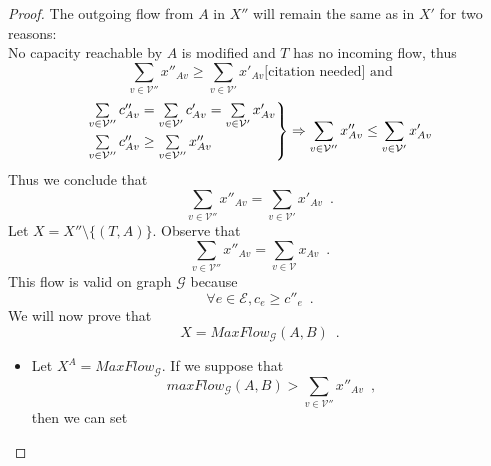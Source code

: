 \documentclass[11pt]{llncs}
\begin{document}
\begin{proof}
       The outgoing flow from $A$ in $X''$ will remain the same as in $X'$ for two reasons: \\
       No capacity reachable by $A$ is modified and $T$ has no incoming flow, thus
       \begin{equation}
          \sum\limits_{v \in \mathcal{V}''}x''_{Av} \geq \sum\limits_{v \in \mathcal{V}'}x'_{Av} \mbox{[citation needed] and}
       \end{equation}
       \begin{equation}
          \begin{rcases}
             \sum\limits_{v \in \mathcal{V}''}c''_{Av} = \sum\limits_{v \in \mathcal{V}'}c'_{Av} = \sum\limits_{v \in
             \mathcal{V}'}x'_{Av} \\
             \sum\limits_{v \in \mathcal{V}''}c''_{Av} \geq \sum\limits_{v \in \mathcal{V}''}x''_{Av}
          \end{rcases}
          \Rightarrow \sum\limits_{v \in \mathcal{V}''}x''_{Av} \leq \sum\limits_{v \in \mathcal{V}'}x'_{Av}
       \end{equation}
       Thus we conclude that
       \begin{equation}
       \label{primeequaldoubleprime}
          \sum\limits_{v \in \mathcal{V}''}x''_{Av} = \sum\limits_{v \in \mathcal{V}'}x'_{Av} \enspace.
       \end{equation}
       Let $X = X'' \setminus \{(T, A)\}$. Observe that
       \begin{equation}
          \sum\limits_{v \in \mathcal{V}''}x''_{Av} = \sum\limits_{v \in \mathcal{V}}x_{Av} \enspace.
       \end{equation}
       This flow is valid on graph $\mathcal{G}$ because
       \begin{equation}
          \forall e \in \mathcal{E}, c_e \geq c''_e \enspace.
       \end{equation}
       We will now prove that
       \begin{equation}
          X = MaxFlow_{\mathcal{G}}\left(A, B\right) \enspace.
       \end{equation}
       \begin{itemize}
          \item Let $X^A = MaxFlow_{\mathcal{G}}$. If we suppose that
          \begin{equation}
             maxFlow_{\mathcal{G}}\left(A, B\right) > \sum\limits_{v \in \mathcal{V}''}x''_{Av} \enspace,
          \end{equation}
          then we can set

\end{itemize}
\end{proof}
\end{document}
